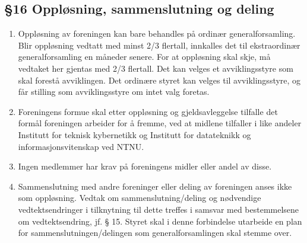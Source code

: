 \documentclass[a4paper,11pt,titlepage]{article}
\begin{document}
\subsection*{§16 Oppløsning, sammenslutning og deling}

\begin{enumerate}
\item Oppløsning av foreningen kan bare behandles på ordinær generalforsamling. Blir oppløsning vedtatt med minst 2/3 flertall, innkalles det til ekstraordinær generalforsamling en måneder senere. For at oppløsning skal skje, må vedtaket her gjentas med 2/3 flertall. Det kan velges et avviklingsstyre som skal forestå avviklingen. Det ordinære styret kan velges til avviklingsstyre, og får stilling som avviklingsstyre om intet valg foretas. 

\item Foreningens formue skal etter oppløsning og gjeldsavleggelse tilfalle det formål foreningen arbeider for å fremme, ved at midlene tilfaller i like andeler Institutt for teknisk kybernetikk og Institutt for datateknikk og informasjonsvitenskap ved NTNU.

\item Ingen medlemmer har krav på foreningens midler eller andel av disse.

\item Sammenslutning med andre foreninger eller deling av foreningen anses ikke som oppløsning. Vedtak om sammenslutning/deling og nødvendige vedtektsendringer i tilknytning til dette treffes i samsvar med bestemmelsene om vedtektsendring, jf. § 15. Styret skal i denne forbindelse utarbeide en plan for sammenslutningen/delingen som generalforsamlingen skal stemme over.

\end{enumerate}
\end{document}
